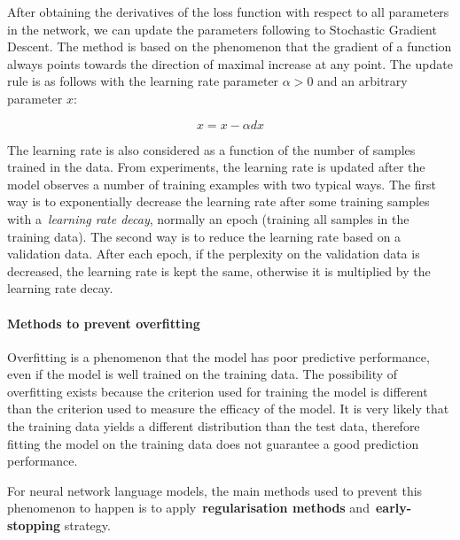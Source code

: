After obtaining the derivatives of the loss function with respect to all parameters in the network, we can update the parameters following to Stochastic Gradient Descent. The method is based on the phenomenon that the gradient of a function always points towards the direction of maximal increase at any point. The update rule is as follows with the learning rate parameter $\alpha > 0$ and an arbitrary parameter $x$:

\begin{equation}
x = x - \alpha dx
\label{eq:sgd}
\end{equation}

The learning rate is also considered as a function of the number of samples trained in the data. From experiments, the learning rate is updated after the model observes a number of training examples with two typical ways. The first way is to exponentially decrease the learning rate after some training samples with a~\textit{learning rate decay}, normally an epoch (training all samples in the training data). The second way is to reduce the learning rate based on a validation data. After each epoch, if the perplexity on the validation data is decreased, the learning rate is kept the same, otherwise it is multiplied by the learning rate decay.

\paragraph{Methods to prevent overfitting} Overfitting is a phenomenon that the model has poor predictive performance, even if the model is well trained on the training data. The possibility of overfitting exists because the criterion used for training the model is different than the criterion used to measure the efficacy of the model. It is very likely that the training data yields a different distribution than the test data, therefore fitting the model on the training data does not guarantee a good prediction performance. 

For neural network language models, the main methods used to prevent this phenomenon to happen is to apply~\textbf{regularisation methods} and~\textbf{early-stopping} strategy. 

